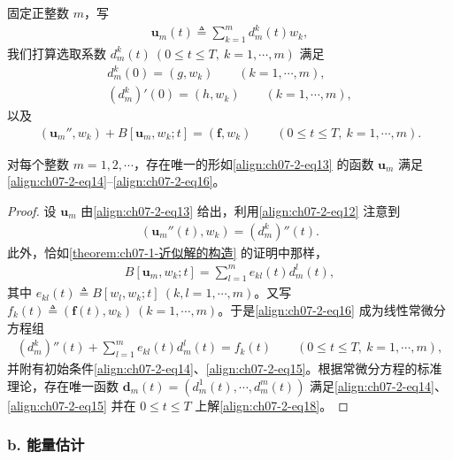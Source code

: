 \documentclass[../../main.tex]{subfiles}
\begin{document}
固定正整数 $m$，写
\begin{align}
\mathbf{u}_m(t)\triangleq \sum_{k=1}^m d_m^k(t)w_k,\label{align:ch07-2-eq13}
\end{align}
我们打算选取系数 $d_m^k(t)\ (0\leqslant t\leqslant T,\ k=1,\cdots,m)$ 满足
\begin{align}
d_m^k(0)=(g,w_k)\qquad (k=1,\cdots,m),\label{align:ch07-2-eq14}\\
(d_m^k)'(0)=(h,w_k)\qquad (k=1,\cdots,m),\label{align:ch07-2-eq15}
\end{align}
以及
\begin{align}
(\mathbf{u}_m'',w_k)+B[\mathbf{u}_m,w_k;t]=(\mathbf{f},w_k)\qquad (0\leqslant t\leqslant T,\ k=1,\cdots,m).\label{align:ch07-2-eq16}
\end{align}

\begin{theorem}[近似解的构造。]\label{theorem:ch07-2-近似解的构造}对每个整数 $m=1,2,\cdots$，存在唯一的形如\eqref{align:ch07-2-eq13} 的函数 $\mathbf{u}_m$ 满足\eqref{align:ch07-2-eq14}--\eqref{align:ch07-2-eq16}。
\end{theorem}

\begin{proof}
设 $\mathbf{u}_m$ 由\eqref{align:ch07-2-eq13} 给出，利用\eqref{align:ch07-2-eq12} 注意到
\begin{align}
(\mathbf{u}_m''(t),w_k)=(d_m^k)''(t).\label{align:ch07-2-eq17}
\end{align}
此外，恰如\cref{theorem:ch07-1-近似解的构造} 的证明中那样，
\begin{align*}
B[\mathbf{u}_m,w_k;t]=\sum_{l=1}^m e_{kl}(t)d_m^l(t),
\end{align*}
其中 $e_{kl}(t)\triangleq B[w_l,w_k;t]\ (k,l=1,\cdots,m)$。又写 $f_k(t)\triangleq(\mathbf{f}(t),w_k)\ (k=1,\cdots,m)$。于是\eqref{align:ch07-2-eq16} 成为线性常微分方程组
\begin{align}
(d_m^k)''(t)+\sum_{l=1}^m e_{kl}(t)d_m^l(t)=f_k(t)\qquad (0\leqslant t\leqslant T,\ k=1,\cdots,m),\label{align:ch07-2-eq18}
\end{align}
并附有初始条件\eqref{align:ch07-2-eq14}、\eqref{align:ch07-2-eq15}。根据常微分方程的标准理论，存在唯一函数 $\mathbf{d}_m(t)=(d_m^1(t),\cdots,d_m^m(t))$ 满足\eqref{align:ch07-2-eq14}、\eqref{align:ch07-2-eq15} 并在 $0\leqslant t\leqslant T$ 上解\eqref{align:ch07-2-eq18}。
\end{proof}

\subsubsection*{b. 能量估计}
\end{document}

